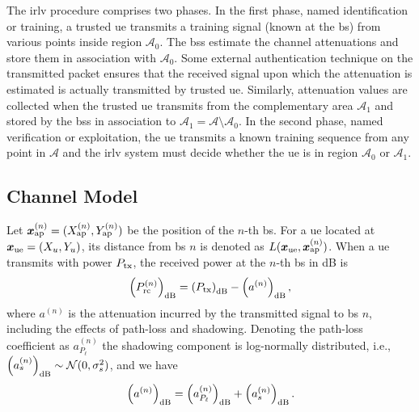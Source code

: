 \documentclass[conference,draftcls,onecolumn]{IEEEtran}
\begin{document}
The \ac{irlv} procedure comprises two phases. In the first phase, named identification or training, a trusted \ac{ue} transmits a training signal (known at the \acs{bs}) from various points inside region $\mathcal{A}_0$.  The \acp{bs} estimate the channel attenuations and store them in association with $\mathcal{A}_0$. Some external authentication technique on the transmitted packet  ensures that the received signal upon which the attenuation is estimated is actually transmitted by trusted \ac{ue}. Similarly, attenuation values are collected when the trusted \ac{ue} transmits  from the complementary area $\mathcal{A}_1$ and  stored by the \acp{bs} in association to $\mathcal{A}_1 = \mathcal{A} \setminus \mathcal{A}_0$. In the second  phase, named verification or exploitation, the \ac{ue} transmits a known training sequence from any point in $\mathcal{A}$ and the \ac{irlv} system must decide whether the \ac{ue} is in region $\mathcal{A}_0$ or $\mathcal{A}_1$.


\subsection{Channel Model}

Let $\bm{x}_{\rm ap}^{(n)} =(X_{\rm ap}^{(n)},Y_{\rm ap}^{(n)})$ be the position of the $n$-th \ac{bs}. For a \ac{ue} located at $\bm{x}_{\rm ue}=(X_u,Y_u)$, its distance from \ac{bs} $n$ is denoted as $L(\bm{x}_{\rm ue},\bm{x}_{\rm ap}^{(n)})$. When a \ac{ue} transmits with power $P_{\rm tx}$, the received power at the $n$-th \ac{bs} in dB is
\begin{equation}\label{eq: rec pow}
    \left(P_{\rm rc}^{(n)}\right)_{\rm dB}= \left(P_{\rm tx}\right)_{\rm dB} - \left(a^{(n)}\right)_{\rm dB},
\end{equation}
where $a^{(n)}$ is the attenuation incurred by the transmitted signal to \ac{bs} $n$, including the effects of path-loss and shadowing. Denoting the path-loss coefficient as $a_{P_{\ell}}^{(n)}$  the shadowing component is log-normally distributed, i.e., $\left(a_{s}^{(n)}\right)_{\rm dB} \sim \mathcal{N}(0,\sigma_s^2)$, and we have
\begin{equation}
    \left(a^{(n)}\right)_{\rm dB} = \left(a_{P_{\ell}}^{(n)}\right)_{\rm dB} + \left(a_s^{(n)}\right)_{\rm dB}.
\end{equation}
\end{document}
